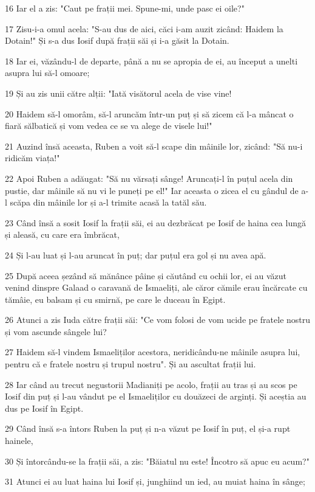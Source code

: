\par 16 Iar el a zis: "Caut pe frații mei. Spune-mi, unde pasc ei oile?"
\par 17 Zisu-i-a omul acela: "S-au dus de aici, căci i-am auzit zicând: Haidem la Dotain!" Și s-a dus Iosif după frații săi și i-a găsit la Dotain.
\par 18 Iar ei, văzându-l de departe, până a nu se apropia de ei, au început a unelti asupra lui să-l omoare;
\par 19 Și au zis unii către alții: "Iată visătorul acela de vise vine!
\par 20 Haidem să-l omorâm, să-l aruncăm într-un puț și să zicem că l-a mâncat o fiară sălbatică și vom vedea ce se va alege de visele lui!"
\par 21 Auzind însă aceasta, Ruben a voit să-l scape din mâinile lor, zicând: "Să nu-i ridicăm viața!"
\par 22 Apoi Ruben a adăugat: "Să nu vărsați sânge! Aruncați-l în puțul acela din pustie, dar mâinile să nu vi le puneți pe el!" Iar aceasta o zicea el cu gândul de a-l scăpa din mâinile lor și a-l trimite acasă la tatăl său.
\par 23 Când însă a sosit Iosif la frații săi, ei au dezbrăcat pe Iosif de haina cea lungă și aleasă, cu care era îmbrăcat,
\par 24 Și l-au luat și l-au aruncat în puț; dar puțul era gol și nu avea apă.
\par 25 După aceea șezând să mănânce pâine și căutând cu ochii lor, ei au văzut venind dinspre Galaad o caravană de Ismaeliți, ale căror cămile erau încărcate cu tămâie, eu balsam și cu smirnă, pe care le duceau în Egipt.
\par 26 Atunci a zis Iuda către frații săi: "Ce vom folosi de vom ucide pe fratele nostru și vom ascunde sângele lui?
\par 27 Haidem să-l vindem Ismaeliților acestora, neridicându-ne mâinile asupra lui, pentru că e fratele nostru și trupul nostru". Și au ascultat frații lui.
\par 28 Iar când au trecut negustorii Madianiți pe acolo, frații au tras și au scos pe Iosif din puț și l-au vândut pe el Ismaeliților cu douăzeci de arginți. Și aceștia au dus pe Iosif în Egipt.
\par 29 Când însă s-a întors Ruben la puț și n-a văzut pe Iosif în puț, el și-a rupt hainele,
\par 30 Și întorcându-se la frații săi, a zis: "Băiatul nu este! Încotro să apuc eu acum?"
\par 31 Atunci ei au luat haina lui Iosif și, junghiind un ied, au muiat haina în sânge;
